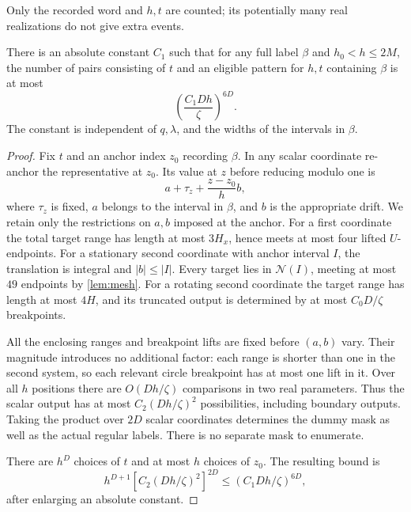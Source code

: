 Only the recorded word and \(h,t\) are counted; its potentially many
real realizations do not give extra events.

\begin{lemma}\label{lem:local}
There is an absolute constant \(C_1\) such that for any full label
\(\beta\) and \(h_0<h\le2M\), the number of pairs consisting of \(t\)
and an eligible pattern for \(h,t\) containing \(\beta\) is at most
\begin{equation}\label{eq:local-count}
 \left(\frac{C_1 D h}{\zeta}\right)^{6D}.
\end{equation}
The constant is independent of \(q,\lambda\), and the widths of the
intervals in \(\beta\).
\end{lemma}

\begin{proof}
Fix \(t\) and an anchor index \(z_0\) recording \(\beta\).
In any scalar coordinate re-anchor the representative at \(z_0\).
Its value at \(z\) before reducing modulo one is
\[
 a+\tau_z+\frac{z-z_0}{h}b,
\]
where \(\tau_z\) is fixed, \(a\) belongs to the interval in \(\beta\),
and \(b\) is the appropriate drift.
We retain only the restrictions on \(a,b\) imposed at the anchor.
For a first coordinate the total target range has length at most
\(3H_x\), hence meets at most four lifted \(U\)-endpoints.
For a stationary second coordinate with anchor interval \(I\), the
translation is integral and \(|b|\le |I|\).
Every target lies in \(\mathcal N(I)\), meeting at most \(49\)
endpoints by \cref{lem:mesh}.
For a rotating second coordinate the target range has length at most
\(4H\), and its truncated output is determined by at most
\(C_0D/\zeta\) breakpoints.

All the enclosing ranges and breakpoint lifts are fixed before
\((a,b)\) vary. Their magnitude introduces no additional factor:
each range is shorter than one in the second system, so each
relevant circle breakpoint has at most one lift in it.
Over all \(h\) positions there are \(O(Dh/\zeta)\) comparisons in
two real parameters. Thus the scalar output has at most
\(C_2(Dh/\zeta)^2\) possibilities, including boundary outputs.
Taking the product over \(2D\) scalar coordinates determines the
dummy mask as well as the actual regular labels.
There is no separate mask to enumerate.

There are \(h^D\) choices of \(t\) and at most \(h\) choices of \(z_0\).
The resulting bound is
\[
 h^{D+1}[C_2(Dh/\zeta)^2]^{2D}
 \le(C_1Dh/\zeta)^{6D},
\]
after enlarging an absolute constant.
\end{proof}

